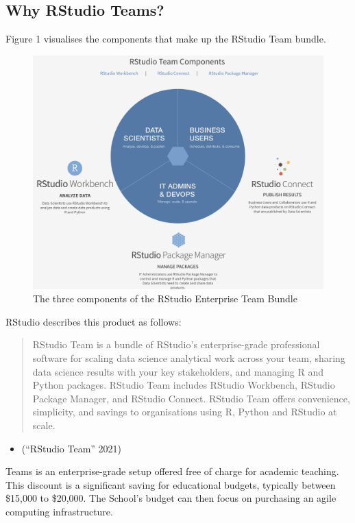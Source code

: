 \documentclass{article}
\begin{document}
\hypertarget{why-rstudio-teams}{%
\subsection{Why RStudio Teams?}\label{why-rstudio-teams}}

Figure 1 visualises the components that make up the RStudio Team bundle.

\begin{figure}

{\centering \includegraphics[width=0.7\linewidth]{img/Team} 

}

\caption{The three components of the RStudio Enterprise Team Bundle}\label{fig:rstudioteams}
\end{figure}

RStudio describes this product as follows:

\begin{quote}
RStudio Team is a bundle of RStudio's enterprise-grade professional
software for scaling data science analytical work across your team,
sharing data science results with your key stakeholders, and managing R
and Python packages. RStudio Team includes RStudio Workbench, RStudio
Package Manager, and RStudio Connect. RStudio Team offers convenience,
simplicity, and savings to organisations using R, Python and RStudio at
scale.
\end{quote}

\begin{itemize}
\tightlist
\item
  (``RStudio Team'' 2021)
\end{itemize}

Teams is an enterprise-grade setup offered free of charge for academic
teaching. This discount is a significant saving for educational budgets,
typically between \$15,000 to \$20,000. The School's budget can then
focus on purchasing an agile computing infrastructure.
\end{document}
